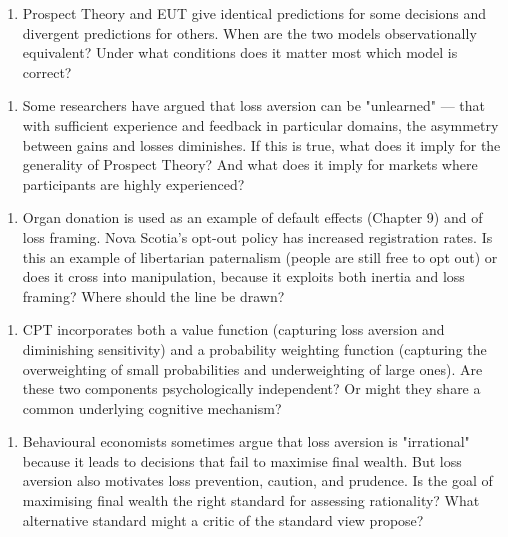 \documentclass[12pt, letterpaper]{article}
\begin{document}
\begin{enumerate}
\item Prospect Theory and EUT give identical predictions for some decisions and divergent predictions for others. When are the two models observationally equivalent? Under what conditions does it matter most which model is correct?
\end{enumerate}

\begin{enumerate}
\item Some researchers have argued that loss aversion can be "unlearned" --- that with sufficient experience and feedback in particular domains, the asymmetry between gains and losses diminishes. If this is true, what does it imply for the generality of Prospect Theory? And what does it imply for markets where participants are highly experienced?
\end{enumerate}

\begin{enumerate}
\item Organ donation is used as an example of default effects (Chapter 9) and of loss framing. Nova Scotia's opt-out policy has increased registration rates. Is this an example of libertarian paternalism (people are still free to opt out) or does it cross into manipulation, because it exploits both inertia and loss framing? Where should the line be drawn?
\end{enumerate}

\begin{enumerate}
\item CPT incorporates both a value function (capturing loss aversion and diminishing sensitivity) and a probability weighting function (capturing the overweighting of small probabilities and underweighting of large ones). Are these two components psychologically independent? Or might they share a common underlying cognitive mechanism?
\end{enumerate}

\begin{enumerate}
\item Behavioural economists sometimes argue that loss aversion is "irrational" because it leads to decisions that fail to maximise final wealth. But loss aversion also motivates loss prevention, caution, and prudence. Is the goal of maximising final wealth the right standard for assessing rationality? What alternative standard might a critic of the standard view propose?
\end{enumerate}
\end{document}
